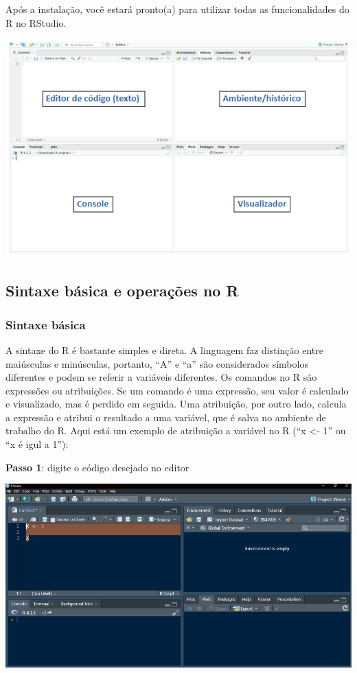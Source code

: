 \documentclass[
]{book}
\begin{document}
Após a instalação, você estará pronto(a) para utilizar todas as funcionalidades do R no RStudio.

\includegraphics[width=5.25in,height=\textheight]{images/clipboard-4172689374.png}

\subsection{Sintaxe básica e operações no R}\label{sintaxe-buxe1sica-e-operauxe7uxf5es-no-r}

\subsubsection{Sintaxe básica}\label{sintaxe-buxe1sica}

A sintaxe do R é bastante simples e direta. A linguagem faz distinção entre maiúsculas e minúsculas, portanto, ``A'' e ``a'' são considerados símbolos diferentes e podem se referir a variáveis diferentes. Os comandos no R são expressões ou atribuições. Se um comando é uma expressão, seu valor é calculado e visualizado, mas é perdido em seguida. Uma atribuição, por outro lado, calcula a expressão e atribui o resultado a uma variável, que é salva no ambiente de trabalho do R. Aqui está um exemplo de atribuição a variável no R (``x \textless- 1'' ou ``x é igul a 1''):

\textbf{Passo 1}: digite o código desejado no editor

\includegraphics{images/clipboard-474586210.png}
\end{document}
